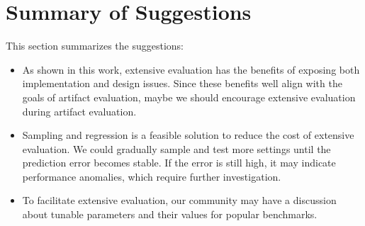 \section{Summary of Suggestions}

This section summarizes the suggestions:

\begin{itemize}[leftmargin=*]
    
    \vspace{-.05in}
    \item As shown in this work, extensive evaluation has the benefits of
    exposing both implementation and design issues. Since these benefits well align
    with the goals of artifact evaluation, maybe we should encourage extensive
    evaluation during artifact evaluation.
    
    \vspace{-.05in}
    \item Sampling and regression is a feasible solution to reduce the cost of
    extensive evaluation. We could gradually sample and test more settings until
    the prediction error becomes stable. If the error is still high, it may indicate
    performance anomalies, which require further investigation.
    
    \vspace{-.05in}
    \item To facilitate extensive evaluation, our community may have a discussion about
    tunable parameters and their values for popular benchmarks.
\end{itemize}